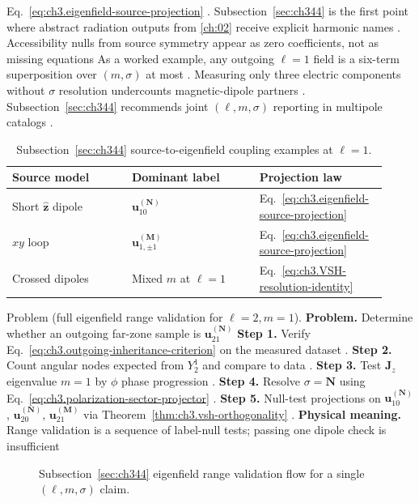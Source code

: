 Eq.~\eqref{eq:ch3.eigenfield-source-projection} . Subsection~\ref{sec:ch344} is the
first point where abstract radiation outputs from \ref{ch:02} receive explicit harmonic names
. Accessibility nulls from source symmetry appear as zero coefficients, not as missing equations
As a worked example, any outgoing \(\ell=1\) field is a six-term superposition over \((m,\sigma)\) at most .
Measuring only three electric components without \(\sigma\) resolution undercounts magnetic-dipole partners
. Subsection~\ref{sec:ch344} recommends joint \((\ell,m,\sigma)\) reporting in
multipole catalogs .
\begin{table}[t]
\centering
\caption{Subsection~\ref{sec:ch344} source-to-eigenfield coupling examples at \(\ell=1\).}
\label{tab:ch3.344-source-coupling-examples}
\small
\begin{tabular}{@{}p{0.30\linewidth}p{0.32\linewidth}p{0.30\linewidth}@{}}
\toprule
Source model & Dominant label & Projection law \\
\midrule
Short \(\hat{\mathbf{z}}\) dipole & \(\mathbf{u}_{10}^{(\mathbf{N})}\) & Eq.~\eqref{eq:ch3.eigenfield-source-projection} \\
\(xy\) loop & \(\mathbf{u}_{1,\pm1}^{(\mathbf{M})}\) & Eq.~\eqref{eq:ch3.eigenfield-source-projection} \\
Crossed dipoles & Mixed \(m\) at \(\ell=1\) & Eq.~\eqref{eq:ch3.VSH-resolution-identity} \\
\bottomrule
\end{tabular}
\end{table}
Problem (full eigenfield range validation for \(\ell=2,m=1\)). \textbf{Problem.} Determine whether an outgoing far-zone sample is \(\mathbf{u}_{21}^{(\mathbf{N})}\)
\textbf{Step 1.} Verify Eq.~\eqref{eq:ch3.outgoing-inheritance-criterion} on the measured dataset .
\textbf{Step 2.} Count angular nodes expected from \(Y_{2}^{1}\) and compare to data .
\textbf{Step 3.} Test \(\mathbf{J}_{z}\) eigenvalue \(m=1\) by \(\phi\) phase progression .
\textbf{Step 4.} Resolve \(\sigma=\mathbf{N}\) using Eq.~\eqref{eq:ch3.polarization-sector-projector} .
\textbf{Step 5.} Null-test projections on \(\mathbf{u}_{10}^{(\mathbf{N})}\), \(\mathbf{u}_{20}^{(\mathbf{N})}\),
\(\mathbf{u}_{21}^{(\mathbf{M})}\) via Theorem~\ref{thm:ch3.vsh-orthogonality} .
\textbf{Physical meaning.} Range validation is a sequence of label-null tests; passing one dipole check is insufficient
\begin{figure}[t]
\centering
{}
\caption{Subsection~\ref{sec:ch344} eigenfield range validation flow for a single \((\ell,m,\sigma)\) claim.}
\label{fig:ch3.344-certification-flow}
\end{figure}
